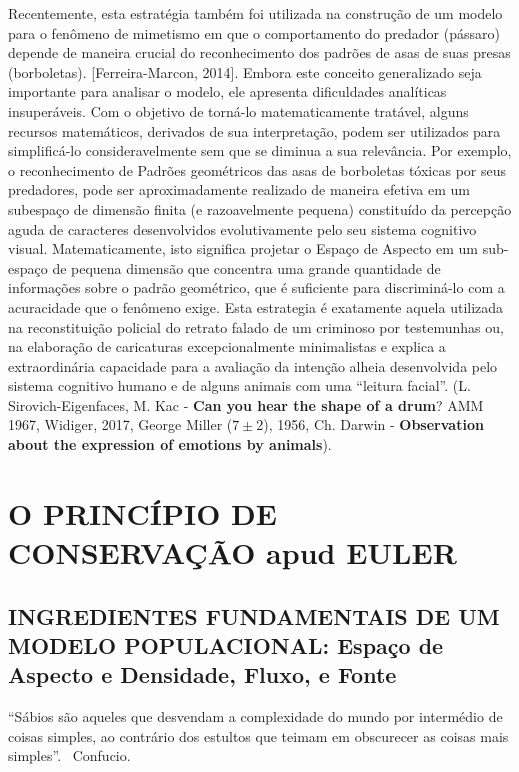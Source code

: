 {Recentemente, esta estratégia também foi utilizada na construção de um modelo para o fenômeno de mimetismo em que o comportamento do predador (pássaro) depende de maneira crucial do reconhecimento dos padrões de asas de suas presas (borboletas). [Ferreira-Marcon, 2014]. Embora este conceito generalizado seja importante para analisar o modelo, ele apresenta dificuldades analíticas insuperáveis. Com o objetivo de torná-lo matematicamente tratável, alguns recursos matemáticos, derivados de sua interpretação, podem ser utilizados para simplificá-lo consideravelmente sem que se diminua a sua relevância. Por exemplo, o reconhecimento de Padrões geométricos das asas de borboletas tóxicas por seus predadores, pode ser aproximadamente realizado de maneira efetiva em um subespaço de dimensão finita (e razoavelmente pequena) constituído da percepção aguda de caracteres desenvolvidos evolutivamente pelo seu sistema cognitivo visual. Matematicamente, isto significa projetar o Espaço de Aspecto em um sub-espaço de pequena dimensão que concentra uma grande quantidade de informações sobre o padrão geométrico, que é suficiente para discriminá-lo com a acuracidade que o fenômeno exige. Esta estrategia é exatamente aquela utilizada na reconstituição policial do retrato falado de um criminoso por testemunhas ou, na elaboração de caricaturas excepcionalmente minimalistas e explica a extraordinária capacidade para a avaliação da intenção alheia desenvolvida pelo sistema cognitivo humano e de alguns animais com uma ``leitura facial''. (L. Sirovich-Eigenfaces, M. Kac - \textbf{Can you hear the shape of a drum}? AMM 1967, Widiger, 2017, George Miller (\(7 \pm 2\)), 1956, Ch. Darwin - \textbf{Observation about the expression of emotions by animals}).
}

\section{O PRINCÍPIO DE CONSERVAÇÃO apud EULER}

\subsection{INGREDIENTES FUNDAMENTAIS DE UM MODELO POPULACIONAL: Espaço de Aspecto e Densidade, Fluxo, e Fonte}

\begin{citacao}
``Sábios são aqueles que desvendam a complexidade do mundo por intermédio de coisas simples, ao contrário dos estultos que teimam em obscurecer as coisas mais simples''. ~Confucio.
\end{citacao}

